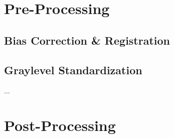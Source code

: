 \section{Pre-Processing}\label{s:meth-pre}

\subsection{Bias Correction \& Registration}\label{ss:meth-bias+reg}

\subsection{Graylevel Standardization}\label{ss:meth-ystd}
\par...\par
\clearpage
\section{Post-Processing}\label{s:meth-post}

\clearpage
